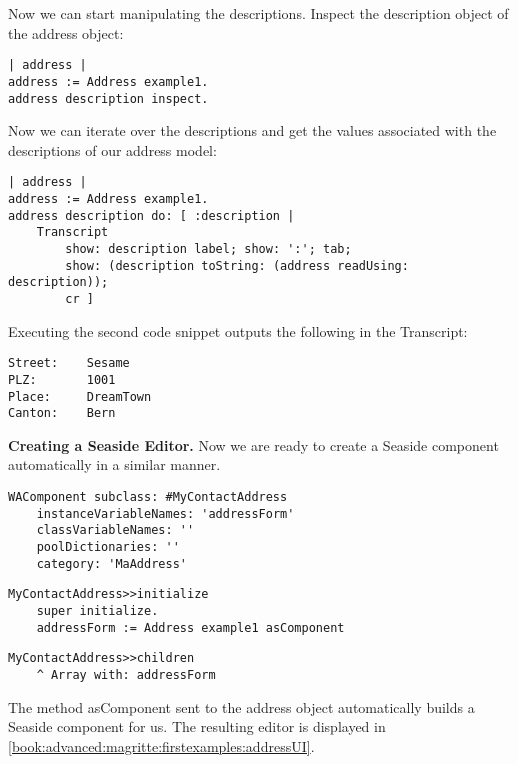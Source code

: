 \documentclass[a4paper,10pt,twoside]{book}
\newcommand{\ct}[1]{{\small\ttfamily\textup{#1}}}
\begin{document}
Now we can start manipulating the descriptions. Inspect the description object of the address object:

\begin{lstlisting}
| address |
address := Address example1.
address description inspect.
\end{lstlisting}

Now we can iterate over the descriptions and get the values associated with the descriptions of our address model:

\begin{lstlisting}
| address |
address := Address example1.
address description do: [ :description |
    Transcript
        show: description label; show: ':'; tab;
        show: (description toString: (address readUsing: description));
        cr ]
\end{lstlisting}

Executing the second code snippet outputs the following in the Transcript:

\begin{lstlisting}
Street:    Sesame
PLZ:       1001
Place:     DreamTown
Canton:    Bern
\end{lstlisting}

\textbf{Creating a Seaside Editor.} Now we are ready to create a Seaside component automatically in a similar manner. 

\begin{lstlisting}
WAComponent subclass: #MyContactAddress
    instanceVariableNames: 'addressForm'
    classVariableNames: ''
    poolDictionaries: ''
    category: 'MaAddress'
\end{lstlisting}

\begin{lstlisting}
MyContactAddress>>initialize
    super initialize.
    addressForm := Address example1 asComponent
\end{lstlisting}

\begin{lstlisting}
MyContactAddress>>children
    ^ Array with: addressForm
\end{lstlisting}

The method \ct{asComponent} sent to the address object automatically builds a Seaside component for us. The resulting editor is displayed in \autoref{book:advanced:magritte:firstexamples:addressUI}.
\end{document}
